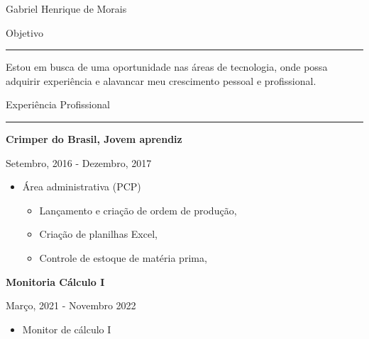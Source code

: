 \documentclass{letter}
\begin{document}
\begin{minipage}[t]{0.60\textwidth}
\setlength{\baselineskip}{1.5\baselineskip}
\vspace{0.8cm}
{\huge Gabriel Henrique de Morais}



\vspace{0.5cm}

 {\large Objetivo}
\rule{\linewidth}{0.4pt}

Estou em busca de uma oportunidade nas áreas de tecnologia, onde possa adquirir experiência e alavancar meu crescimento pessoal e profissional.

\vspace{0.5cm}

{\large Experiência Profissional}
\rule{\linewidth}{0.4pt}

{\large \textbf{Crimper do Brasil, Jovem aprendiz}}

{\small Setembro, 2016 - Dezembro, 2017}

\begin{itemize}
    \item Área administrativa (PCP)
    \begin{itemize}
        \item Lançamento e criação de ordem de produção,
        \item Criação de planilhas Excel,
        \item Controle de estoque de matéria prima,
    \end{itemize}
\end{itemize}



        

{\large \textbf{Monitoria Cálculo I}}

{\small Março, 2021 - Novembro 2022}

\begin{itemize}
    \item Monitor de cálculo I
   

\end{itemize}
\end{minipage}
\end{document}

